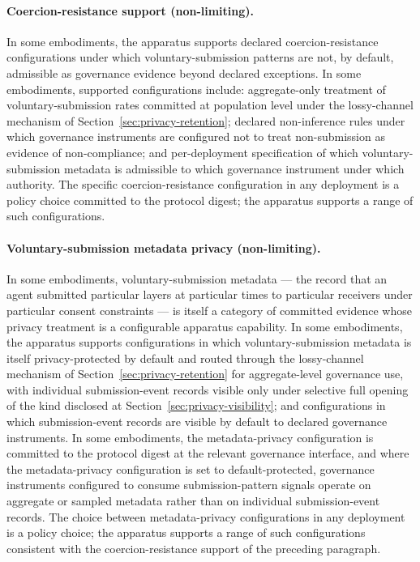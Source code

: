 \documentclass[a4paper,12pt]{article}
\begin{document}
\paragraph{Coercion-resistance support (non-limiting).}
In some embodiments, the apparatus supports declared
coercion-resistance configurations under which voluntary-submission
patterns are not, by default, admissible as governance evidence
beyond declared exceptions. In some embodiments, supported
configurations include: aggregate-only treatment of
voluntary-submission rates committed at population level under the
lossy-channel mechanism of Section~\ref{sec:privacy-retention};
declared non-inference rules under which governance instruments are
configured not to treat non-submission as evidence of non-compliance;
and per-deployment specification of which voluntary-submission
metadata is admissible to which governance instrument under which
authority. The specific coercion-resistance configuration in any
deployment is a policy choice committed to the protocol digest;
the apparatus supports a range of such configurations.

\paragraph{Voluntary-submission metadata privacy (non-limiting).}
In some embodiments, voluntary-submission metadata --- the record
that an agent submitted particular layers at particular times to
particular receivers under particular consent constraints --- is
itself a category of committed evidence whose privacy treatment is a
configurable apparatus capability. In some embodiments, the apparatus
supports configurations in which voluntary-submission metadata is
itself privacy-protected by default and routed through the
lossy-channel mechanism of Section~\ref{sec:privacy-retention} for
aggregate-level governance use, with individual submission-event
records visible only under selective full opening of the kind
disclosed at Section~\ref{sec:privacy-visibility}; and configurations
in which submission-event records are visible by default to
declared governance instruments. In some embodiments, the
metadata-privacy configuration is committed to the protocol digest
at the relevant governance interface, and where the metadata-privacy
configuration is set to default-protected, governance instruments
configured to consume submission-pattern signals operate on
aggregate or sampled metadata rather than on individual
submission-event records. The choice between metadata-privacy
configurations in any deployment is a policy choice; the apparatus
supports a range of such configurations consistent with the
coercion-resistance support of the preceding paragraph.
\end{document}
